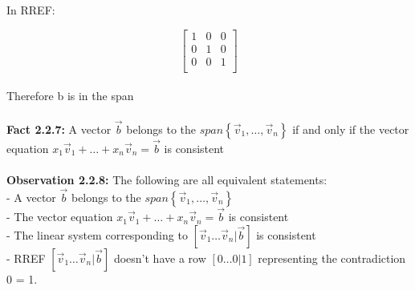 \documentclass{article}
\begin{document}
{In RREF:

$$
\begin{bmatrix} 
1  & 0 & 0 \\ 
0 & 1 & 0 \\
0 & 0 & 1 \\
\end{bmatrix}
$$\\
Therefore b is in the span\\
\\
\textbf{Fact 2.2.7:} A vector $\vec{b}$ belongs to the $span\left\{\vec{v}_{1}, \dots, \vec{v}_{n}\right\}$ if and only if the vector equation $x_{1}\vec{v}_{1} + \dots + x_{n}\vec{v}_{n} = \vec{b} $ is consistent\\
\\
\newpage
\noindent\textbf{Observation 2.2.8:} The following are all equivalent statements:\\
- A vector $\vec{b}$ belongs to the $span\left\{\vec{v}_{1}, \dots, \vec{v}_{n}\right\}$\\
- The vector equation $x_{1}\vec{v}_{1} + \dots + x_{n}\vec{v}_{n} = \vec{b} $ is consistent\\
- The linear system corresponding to $[ \vec{v}_{1} \dots \vec{v}_{n} \big| \vec{b} ]$ is consistent\\
- RREF $[ \vec{v}_{1} \dots \vec{v}_{n} \big| \vec{b} ]$ doesn't have a row $[ 0 \dots 0 \big| 1 ]$ representing the contradiction 0 = 1.\\
\\
}
\end{document}
